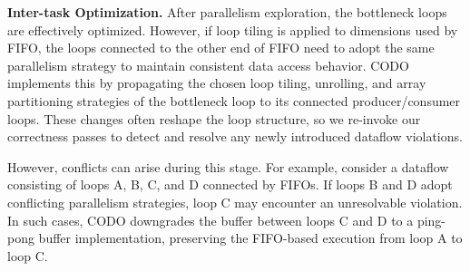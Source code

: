 \documentclass[conference]{IEEEtran}
\begin{document}
\textbf{Inter-task Optimization.}
After parallelism exploration, the bottleneck loops are effectively optimized. However, if loop tiling is applied to dimensions used by FIFO, the loops connected to the other end of FIFO need to adopt the same parallelism strategy to maintain consistent data access behavior. 
CODO implements this by propagating the chosen loop tiling, unrolling, and array partitioning strategies of the bottleneck loop to its connected producer/consumer loops.
These changes often reshape the loop structure, so we re-invoke our correctness passes to detect and resolve any newly introduced dataflow violations.

However, conflicts can arise during this stage. For example, consider a dataflow consisting of loops A, B, C, and D connected by FIFOs. If loops B and D adopt conflicting parallelism strategies, loop C may encounter an unresolvable violation. In such cases, CODO downgrades the buffer between loops C and D to a ping-pong buffer implementation, preserving the FIFO-based execution from loop A to loop C. 

\end{document}
